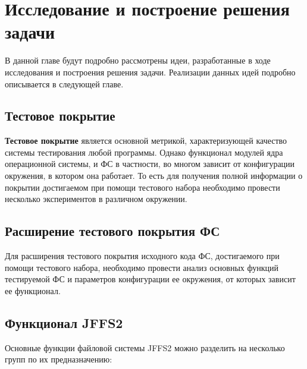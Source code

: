 \section{Исследование и построение решения задачи}
\label{sec:Chapter3} 

В данной главе будут подробно рассмотрены идеи, разработанные в ходе исследования и построения решения задачи. Реализации данных идей подробно описывается в следующей главе.

\subsection{Тестовое покрытие}

\textbf{Тестовое покрытие} является основной метрикой, характеризующей качество системы тестирования любой программы. Однако функционал модулей ядра операционной системы, и ФС в частности, во многом зависит от конфигурации окружения, в котором она работает. То есть для получения полной информации о покрытии достигаемом при помощи тестового набора необходимо провести несколько экспериментов в различном окружении.

\subsection{Расширение тестового покрытия ФС}

Для расширения тестового покрытия исходного кода ФС, достигаемого при помощи тестового набора, необходимо провести анализ основных функций тестируемой ФС и параметров конфигурации ее окружения, от которых зависит ее функционал.

\subsection{Функционал JFFS2}

Основные функции файловой системы JFFS2 можно разделить на несколько групп по их предназначению:

